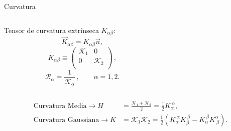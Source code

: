 \documentclass[xcolor=dvipsnames]{beamer}
\begin{document}
\begin{frame}{Curvatura}
  \begin{columns}[T]
    \begin{column}{6.2cm}
      \centering
      Tensor de curvatura extrínseca $K_{\alpha\beta}$:
      \begin{equation*}
        \vec{K}_{\alpha\beta}=K_{\alpha\beta}\vec{n},
      \end{equation*}
      \begin{equation*}
        K_{\alpha\beta}\equiv\left(\begin{array}{cc}
            \mathcal{K}_1 & 0\\
            0 & \mathcal{K}_2\\
          \end{array}\right)\, ,
      \end{equation*}
      \begin{equation*}
        \mathcal{R}_{\alpha}=\frac{1}{\mathcal{K}_{\alpha}} \, , \qquad \alpha=1,2.
      \end{equation*}  
    \end{column}
    \begin{column}{6.25cm}
      \centering
      \begin{figure}[h]
        \resizebox{\columnwidth}{!}{}
      \end{figure} 
    \end{column}
  \end{columns}   
  \begin{align*}
    \text{Curvatura Media}\longrightarrow H&=\frac{\mathcal{K}_1+\mathcal{K}_2}{2}=\frac{1}{2}K_{\alpha}^{\ \alpha},\\
    \text{Curvatura Gaussiana}\longrightarrow  K&=\mathcal{K}_1\mathcal{K}_2=\frac{1}{2}(K_{\alpha}^{\ \alpha}K_{\beta}^{\ \beta}-K_{\alpha}^{\ \beta}K^{\alpha}_{\ \beta}).
  \end{align*}
\end{frame}
\end{document}
